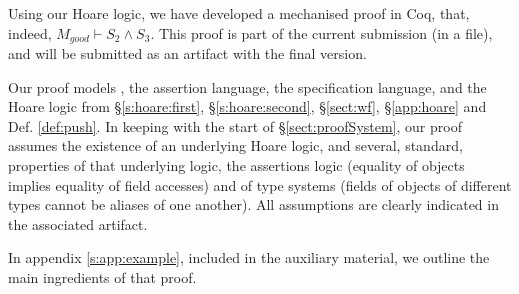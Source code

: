Using our Hoare logic, we have developed a mechanised proof in Coq, that, indeed, $M_{good} \vdash S_2 \wedge S_3$.
This proof is part of the current submission (in a  file), and will be submitted as an artifact with the final version.

Our proof models  \LangOO, the assertion language, the specification language, and the Hoare logic from \S \ref{s:hoare:first},  \S   \ref{s:hoare:second},  \S  \ref{sect:wf},  \S \ref{app:hoare} and Def. \ref{def:push}.
In keeping with   the start of  \S \ref{sect:proofSystem}, our proof assumes the existence of an underlying Hoare logic,  
and several, standard, properties of that underlying logic, the assertions logic (\eg equality of objects implies equality of field accesses) and of type systems
(\eg  fields of objects of different types cannot be aliases of one another).
All assumptions  are clearly indicated in the associated artifact.

%

In appendix \ref{s:app:example}, included in the auxiliary material, we outline the main ingredients of that proof. 

